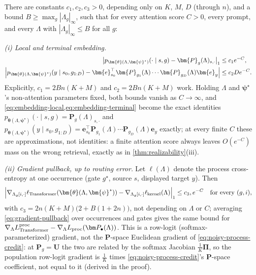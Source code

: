 \begin{proposition}
\label{prop:shared-kernel-embedding}
There are constants $c_1,c_2,c_3>0$, depending only on $K$, $M$, $D$
(through $n$), and a bound $B\ge\max_g|\Lambda_g|_\infty$, such that for every
attention score $C>0$, every prompt, and every $\Lambda$ with $|\Lambda_g|_\infty\le
B$ for all $g$:

\emph{(i) Local and terminal embedding.}
\begin{align}
 \bigl|p_{\bm{\theta}(\Lambda,\bm{\psi}^\star)}(\cdot\mid s,g)-\bm{P}_g(\Lambda)_{s,\cdot}\bigr|_1
 &\le c_1e^{-C},
 \label{eq:embedding-local}\\
 \Bigl|p_{\bm{\theta}(\Lambda,\bm{\psi}^\star)}(y\mid s_0,g_{1:D})
 -\bm{e}_{s_0}^\top \bm{P}_{g_1}(\Lambda)\cdots \bm{P}_{g_D}(\Lambda)\bm{e}_y\Bigr|
 &\le c_2De^{-C}.
 \label{eq:embedding-terminal}
\end{align}
Explicitly, $c_1=2Bn(K+M)$ and $c_2=2Bn(K+M)$ work. Holding $\Lambda$ and
$\bm{\psi}^\star$'s non-attention parameters fixed, both bounds vanish as
$C\to\infty$, and \cref{eq:embedding-local,eq:embedding-terminal} become
the exact identities $p_{\bm{\theta}(\Lambda,\bm{\psi}^\star)}(\cdot\mid
s,g)=\bm{P}_g(\Lambda)_{s,\cdot}$ and $p_{\bm{\theta}(\Lambda,\bm{\psi}^\star)}(y\mid
s_0,g_{1:D})=\bm{e}_{s_0}^\top \bm{P}_{g_1}(\Lambda)\cdots \bm{P}_{g_D}(\Lambda)\bm{e}_y$
exactly; at every finite $C$ these are approximations, not identities: a
finite attention score always leaves $O(e^{-C})$ mass on the wrong
retrieval, exactly as in \cref{thm:realizability}(iii).

\emph{(ii) Gradient pullback, up to routing error.} Let $\ell(\Lambda)$ denote
the process cross-entropy at one occurrence (gate $g^\star$, source $s$,
displayed target $y$). Then
\begin{equation}
 \Bigl|\nabla_{\Lambda_{g}[i,\cdot]}\ell_{\rm Transformer}(\bm{\theta}(\Lambda,\bm{\psi}^\star))
 -\nabla_{\Lambda_{g}[i,\cdot]}\ell_{\rm kernel}(\Lambda)\Bigr|_1
 \le c_3,e^{-C}\quad\text{for every }(g,i),
 \label{eq:gradient-pullback}
\end{equation}
with $c_3=2n(K+M)\bigl(2+B(1+2n)\bigr)$, not depending on $\Lambda$ or $C$;
averaging \cref{eq:gradient-pullback} over occurrences and gates gives the
same bound for $\nabla_\Lambda L_{\rm Transformer}^{\rm proc}-\nabla_\Lambda L_{\rm
proc}(\bm P_\bullet(\Lambda))$. This is a row-logit (softmax-parameterized)
gradient, not the $\bm P$-space Euclidean gradient of
\cref{eq:noisy-process-credit}: at $\bm P_g=\bm U$ the two are related
by the softmax Jacobian $\frac1K\bm\Pi$, so the population row-logit
gradient is $\frac1K$ times \cref{eq:noisy-process-credit}'s $\bm
P$-space coefficient, not equal to it (derived in the proof).


\end{proposition}
